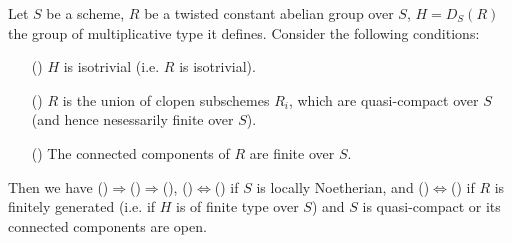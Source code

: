 \begin{proposition}\label{scheme twisted constant abelian isotrivial and connected component prop}
Let $S$ be a scheme, $R$ be a twisted constant abelian group over $S$, $H=D_S(R)$ the group of multiplicative type it defines. Consider the following conditions:
\begin{enumerate}
    \item[(\rmnum{1})] $H$ is isotrivial (i.e. $R$ is isotrivial).
    \item[(\rmnum{2})] $R$ is the union of clopen subschemes $R_i$, which are quasi-compact over $S$ (and hence nesessarily finite over $S$).
    \item[(\rmnum{3})] The connected components of $R$ are finite over $S$.
\end{enumerate}
Then we have ()$\Rightarrow$()$\Rightarrow$(), ()$\Leftrightarrow$() if $S$ is locally Noetherian, and ()$\Leftrightarrow$() if $R$ is finitely generated (i.e. if $H$ is of finite type over $S$) and $S$ is quasi-compact or its connected components are open.
\end{proposition}
